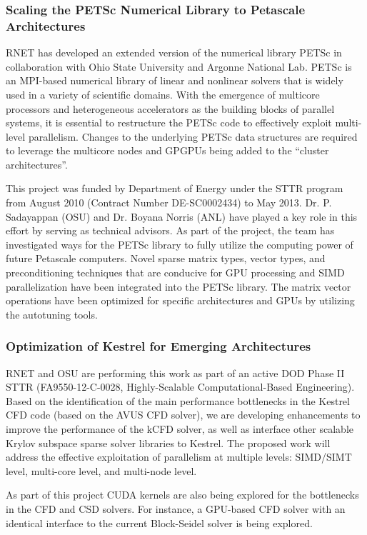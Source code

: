 \subsubsection{Scaling the PETSc Numerical Library to Petascale Architectures}

RNET has developed an extended version of the numerical library PETSc \cite{Lowell1} in
collaboration with Ohio State University and Argonne National Lab. PETSc is an MPI-based numerical library of
linear and nonlinear solvers that is widely used in a variety of scientific domains. With the
emergence of multicore processors and heterogeneous accelerators as the building blocks of
parallel systems, it is essential to restructure the PETSc code to effectively exploit multi-level
parallelism. Changes to the underlying PETSc data structures are required to leverage the multicore
nodes and GPGPUs being added to the ``cluster architectures''.

This project was funded by Department of Energy under the STTR program from August 2010 (Contract Number DE-SC0002434) 
to May 2013. Dr. P. Sadayappan (OSU) and Dr. Boyana Norris (ANL) have played a key role in this effort by serving as 
technical advisors. As part of the project, the team has investigated ways for the PETSc library to fully utilize the 
computing power of future Petascale computers. Novel sparse matrix types,  vector types, and preconditioning techniques 
that are conducive for GPU processing and SIMD parallelization have been integrated into the PETSc library. The matrix 
vector operations have been optimized for specific architectures and GPUs by utilizing the autotuning tools.


\subsubsection{Optimization of Kestrel for Emerging Architectures}
RNET and OSU are performing this work as part of an active DOD Phase
II STTR (FA9550-12-C-0028, Highly-Scalable Computational-Based
Engineering). Based on the identification of the main performance
bottlenecks in the Kestrel CFD code (based on the AVUS CFD solver), we
are developing enhancements to improve the performance of the kCFD
solver, as well as interface other scalable Krylov subspace sparse
solver libraries to Kestrel. The proposed work will address the
effective exploitation of parallelism at multiple levels: SIMD/SIMT
level, multi-core level, and multi-node level.

As part of this project CUDA kernels are also being explored for the
bottlenecks in the CFD and CSD solvers. For instance, a GPU-based CFD
solver with an identical interface to the current Block-Seidel solver
is being explored.



